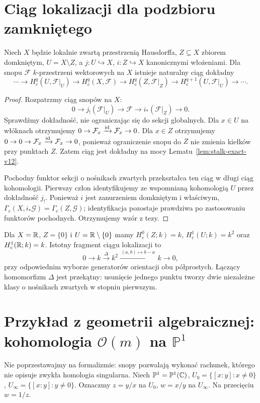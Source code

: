 \section{Ciąg lokalizacji dla podzbioru zamkniętego}
\begin{twierdzenie}
\label{thm:localization-v12}
Niech $X$ będzie lokalnie zwartą przestrzenią Hausdorffa,
$Z\subseteq X$ zbiorem domkniętym, $U=X\setminus Z$,
a $j:U\hookrightarrow X$, $i:Z\hookrightarrow X$
kanonicznymi włożeniami. Dla snopu $\mathcal F$
$k$-przestrzeni wektorowych na $X$ istnieje naturalny
ciąg dokładny
\[
\cdots\to H_c^q(U,\mathcal F|_U)\to H_c^q(X,\mathcal F)
\to H_c^q(Z,\mathcal F|_Z)
\to H_c^{q+1}(U,\mathcal F|_U)\to\cdots.
\]
\end{twierdzenie}
\begin{proof}
Rozpatrzmy ciąg snopów na $X$:
\[
0\longrightarrow j_!(\mathcal F|_U)
\longrightarrow\mathcal F\longrightarrow i_*(\mathcal F|_Z)
\longrightarrow0.
\]
Sprawdźmy dokładność, nie ograniczając się do sekcji globalnych.
Dla $x\in U$ na włóknach otrzymujemy
$0\to\mathcal F_x\xrightarrow{\mathrm{id}}\mathcal F_x\to0$.
Dla $x\in Z$ otrzymujemy
$0\to0\to\mathcal F_x\xrightarrow{\mathrm{id}}\mathcal F_x\to0$,
ponieważ ograniczenie snopu do $Z$ nie zmienia
kiełków przy punktach $Z$. Zatem ciąg jest dokładny
na mocy Lematu~\ref{lem:stalk-exact-v12}.

Pochodny funktor sekcji o nośnikach zwartych
przekształca ten ciąg w długi ciąg kohomologii.
Pierwszy człon identyfikujemy ze wspomnianą
kohomologią $U$ przez dokładność $j_!$.
Ponieważ $i$ jest zanurzeniem domkniętym i właściwym,
$\Gamma_c(X,i_*\mathcal G)=\Gamma_c(Z,\mathcal G)$;
identyfikacja pozostaje prawdziwa po zastosowaniu
funktorów pochodnych. Otrzymujemy wzór z tezy.
\end{proof}

\begin{przyklad}
Dla $X=\mathbb{R}$, $Z=\{0\}$ i $U=\mathbb{R}\setminus\{0\}$ mamy
$H_c^0(Z;k)=k$, $H_c^1(U;k)=k^2$ oraz
$H_c^1(\mathbb{R};k)=k$. Istotny fragment ciągu lokalizacji to
\[
0\longrightarrow k\xrightarrow{\Delta}k^2
\xrightarrow{\,(a,b)\mapsto b-a\,}k\longrightarrow0,
\]
przy odpowiednim wyborze generatorów orientacji
obu półprostych. Łączący homomorfizm $\Delta$
jest przekątny: usunięcie jednego punktu tworzy dwie
niezależne klasy o nośnikach zwartych w stopniu pierwszym.
\end{przyklad}

\section{Przykład z geometrii algebraicznej: kohomologia \texorpdfstring{$\mathcal O(m)$}{O(m)} na \texorpdfstring{$\mathbb P^1$}{P1}}
\label{sec:p1-sheaf-v12}
Nie poprzestawajmy na formalizmie: snopy pozwalają
wykonać rachunek, którego nie opisuje zwykła homologia
singularna. Niech $\mathbb P^1=\mathbb P^1(\mathbb{C})$,
$U_0=\{[x:y]:x\ne0\}$, $U_\infty=\{[x:y]:y\ne0\}$.
Oznaczmy $z=y/x$ na $U_0$, $w=x/y$ na $U_\infty$.
Na przecięciu $w=1/z$.

